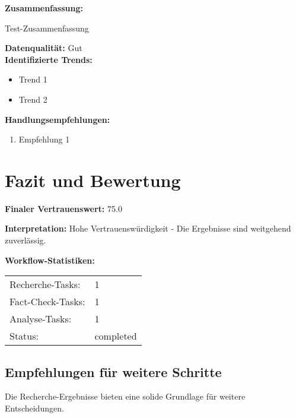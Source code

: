 \documentclass[12pt,a4paper]{article}
\begin{document}
\textbf{Zusammenfassung:}
\begin{infobox}
Test-Zusammenfassung
\end{infobox}

\textbf{Datenqualität:} Gut\\

\textbf{Identifizierte Trends:}
\begin{itemize}
\item Trend 1
\item Trend 2
\end{itemize}

\textbf{Handlungsempfehlungen:}
\begin{enumerate}
\item Empfehlung 1
\end{enumerate}


\newpage
\section{Fazit und Bewertung}

\begin{confidencebox}
\textbf{Finaler Vertrauenswert:} 75.0%
\end{confidencebox}

\textbf{Interpretation:} Hohe Vertrauenswürdigkeit - Die Ergebnisse sind weitgehend zuverlässig.

\textbf{Workflow-Statistiken:}
\begin{tabular}{ll}
Recherche-Tasks: & 1 \\
Fact-Check-Tasks: & 1 \\
Analyse-Tasks: & 1 \\
Status: & completed \\
\end{tabular}

\subsection{Empfehlungen für weitere Schritte}

Die Recherche-Ergebnisse bieten eine solide Grundlage für weitere Entscheidungen.
\end{document}

